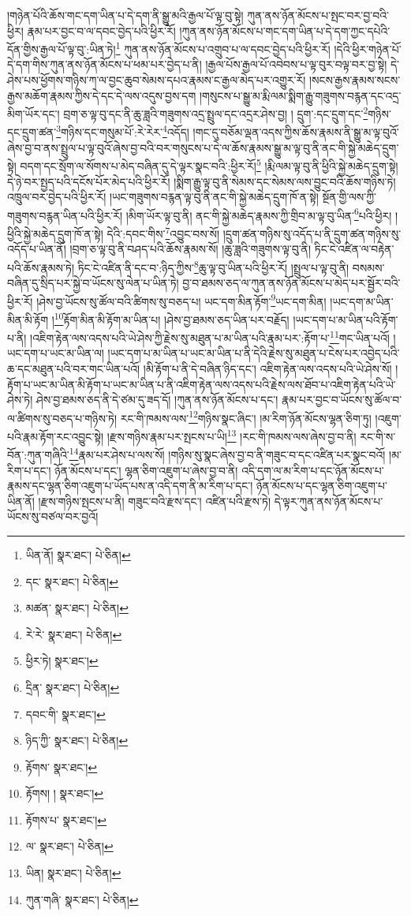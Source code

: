 །གཉེན་པོའི་ཆོས་གང་དག་ཡིན་པ་དེ་དག་ནི་སྒྱུ་མའི་རྒྱལ་པོ་ལྟ་བུ་སྟེ། ཀུན་ནས་ཉོན་མོངས་པ་སྤང་བར་བྱ་བའི་ཕྱིར། རྣམ་པར་བྱང་བ་ལ་དབང་བྱེད་པའི་ཕྱིར་རོ། །ཀུན་ནས་ཉོན་མོངས་པ་གང་དག་ཡིན་པ་དེ་དག་ཀྱང་དཔེའི་དོན་གྱིས་རྒྱལ་པོ་ལྟ་བུ་:ཡིན་ཏེ།\footnote{ཡིན་ནོ།  སྣར་ཐང་།  པེ་ཅིན། } ཀུན་ནས་ཉོན་མོངས་པ་འགྲུབ་པ་ལ་དབང་བྱེད་པའི་ཕྱིར་རོ། །དེའི་ཕྱིར་གཉེན་པོ་དེ་དག་གིས་ཀུན་ནས་ཉོན་མོངས་པ་ཕམ་པར་བྱེད་པ་ནི། །རྒྱལ་པོས་རྒྱལ་པོ་འབེབས་པ་ལྟ་བུར་བལྟ་བར་བྱ་སྟེ། དེ་ཤེས་པས་ཕྱོགས་གཉིས་ཀ་ལ་བྱང་ཆུབ་སེམས་དཔའ་རྣམས་ང་རྒྱལ་མེད་པར་འགྱུར་རོ། །སངས་རྒྱས་རྣམས་སངས་རྒྱས་མཆོག་རྣམས་ཀྱིས་དེ་དང་དེ་ལས་འདུས་བྱས་དག །གསུངས་པ་སྒྱུ་མ་རྨི་ལམ་སྨིག་རྒྱུ་གཟུགས་བརྙན་དང་འདྲ་མིག་ཡོར་དང་། བྲག་ཅ་ལྟ་བུ་དང་ནི་ཆུ་ཟླའི་གཟུགས་འདྲ་སྤྲུལ་དང་འདྲར་ཤེས་བྱ། །
དྲུག་:དང་དྲུག་དང་\footnote{དང་  སྣར་ཐང་།  པེ་ཅིན། }གཉིས་དང་དྲུག་ཚན་\footnote{མཚན་  སྣར་ཐང་།  པེ་ཅིན། }གཉིས་དང་གསུམ་པོ་:རེ་རེར་\footnote{རེ་རེ་  སྣར་ཐང་།  པེ་ཅིན། }འདོད། །གང་དུ་བཅོམ་ལྡན་འདས་ཀྱིས་ཆོས་རྣམས་ནི་སྒྱུ་མ་ལྟ་བུའོ་ཞེས་བྱ་བ་ནས་སྤྲུལ་པ་ལྟ་བུའོ་ཞེས་བྱ་བའི་བར་གསུངས་པ་དེ་ལ་ཆོས་རྣམས་སྒྱུ་མ་ལྟ་བུ་ནི་ནང་གི་སྐྱེ་མཆེད་དྲུག་སྟེ། བདག་དང་སྲོག་ལ་སོགས་པ་མེད་བཞིན་དུ་དེ་ལྟར་སྣང་བའི་:ཕྱིར་རོ།\footnote{ཕྱིར་ཏེ།  སྣར་ཐང་། } །རྨི་ལམ་ལྟ་བུ་ནི་ཕྱིའི་སྐྱེ་མཆེད་དྲུག་སྟེ། དེ་ཉེ་བར་སྤྱད་པའི་དངོས་པོར་མེད་པའི་ཕྱིར་རོ། །སྨིག་རྒྱུ་ལྟ་བུ་ནི་སེམས་དང་སེམས་ལས་བྱུང་བའི་ཆོས་གཉིས་ཏེ། འཁྲུལ་བར་བྱེད་པའི་ཕྱིར་རོ། །ཡང་གཟུགས་བརྙན་ལྟ་བུ་ནི་ནང་གི་སྐྱེ་མཆེད་དྲུག་ཁོ་ན་སྟེ། སྔོན་གྱི་ལས་ཀྱི་གཟུགས་བརྙན་ཡིན་པའི་ཕྱིར་རོ། །མིག་ཡོར་ལྟ་བུ་ནི། ནང་གི་སྐྱེ་མཆེད་རྣམས་ཀྱི་གྲིབ་མ་ལྟ་བུ་ཡིན་\footnote{དྲིན་  སྣར་ཐང་།  པེ་ཅིན། }པའི་ཕྱིར། །ཕྱིའི་སྐྱེ་མཆེད་དྲུག་ཁོ་ན་སྟེ། དེའི་:དབང་གིས་\footnote{དབང་གི་  སྣར་ཐང་། }འབྱུང་བས་སོ། །དྲུག་ཚན་གཉིས་སུ་འདོད་པ་ནི་དྲུག་ཚན་གཉིས་སུ་འདོད་པ་ཡིན་ནོ། །བྲག་ཅ་ལྟ་བུ་ནི་བཤད་པའི་ཆོས་རྣམས་སོ། །ཆུ་ཟླའི་གཟུགས་ལྟ་བུ་ནི། ཏིང་ངེ་འཛིན་ལ་བརྟེན་པའི་ཆོས་རྣམས་ཏེ། ཏིང་ངེ་འཛིན་ནི་དང་བ་:ཉིད་ཀྱིས་\footnote{ཉིད་ཀྱི་  སྣར་ཐང་།  པེ་ཅིན། }ཆུ་ལྟ་བུ་ཡིན་པའི་ཕྱིར་རོ། །སྤྲུལ་པ་ལྟ་བུ་ནི། བསམས་བཞིན་དུ་སྲིད་པར་སྐྱེ་བ་ཡོངས་སུ་ལེན་པ་ཡིན་ཏེ། བྱ་བ་ཐམས་ཅད་ལ་ཀུན་ནས་ཉོན་མོངས་པ་མེད་པར་སྦྱོར་བའི་ཕྱིར་རོ། །ཤེས་བྱ་ཡོངས་སུ་ཚོལ་བའི་ཚིགས་སུ་བཅད་པ། ཡང་དག་མིན་རྟོག་\footnote{རྟོགས་  སྣར་ཐང་། }ཡང་དག་མིན། །ཡང་དག་མ་ཡིན་མིན་མི་རྟོག །\footnote{རྟོགས། །  སྣར་ཐང་། }རྟོག་མིན་མི་རྟོག་མ་ཡིན་པ། །ཤེས་བྱ་ཐམས་ཅད་ཡིན་པར་བརྗོད། །ཡང་དག་པ་མ་ཡིན་པའི་རྟོག་པ་ནི། །འཇིག་རྟེན་ལས་འདས་པའི་ཡེ་ཤེས་ཀྱི་རྗེས་སུ་མཐུན་པ་མ་ཡིན་པའི་རྣམ་པར་:རྟོག་པ་\footnote{རྟོགས་པ་  སྣར་ཐང་། }གང་ཡིན་པའོ། །ཡང་དག་པ་ཡང་མ་ཡིན་ལ། །ཡང་དག་པ་མ་ཡིན་པ་ཡང་མ་ཡིན་པ་ནི་དེའི་རྗེས་སུ་མཐུན་པ་ངེས་པར་འབྱེད་པའི་ཆ་དང་མཐུན་པའི་བར་གང་ཡིན་པའོ། །མི་རྟོག་པ་ནི་དེ་བཞིན་ཉིད་དང་། འཇིག་རྟེན་ལས་འདས་པའི་ཡེ་ཤེས་སོ། །རྟོག་པ་ཡང་མ་ཡིན་མི་རྟོག་པ་ཡང་མ་ཡིན་པ་ནི་འཇིག་རྟེན་ལས་འདས་པའི་རྗེས་ལས་ཐོབ་པ་འཇིག་རྟེན་པའི་ཡེ་ཤེས་ཏེ། ཤེས་བྱ་ཐམས་ཅད་ནི་དེ་ཙམ་དུ་ཟད་དོ། །ཀུན་ནས་ཉོན་མོངས་པ་དང་། རྣམ་པར་བྱང་བ་ཡོངས་སུ་ཚོལ་བ་ལ་ཚིགས་སུ་བཅད་པ་གཉིས་ཏེ། རང་གི་ཁམས་ལས་\footnote{ལ་  སྣར་ཐང་།  པེ་ཅིན། }གཉིས་སྣང་ཞིང་། །མ་རིག་ཉོན་མོངས་ལྷན་ཅིག་ཏུ། །འཇུག་པའི་རྣམ་རྟོག་རང་འབྱུང་སྟེ། །རྫས་གཉིས་རྣམ་པར་སྤངས་པ་ཡི།\footnote{ཡིན།  སྣར་ཐང་།  པེ་ཅིན། } །རང་གི་ཁམས་ལས་ཞེས་བྱ་བ་ནི། རང་གི་ས་བོན་:ཀུན་གཞིའི་\footnote{ཀུན་གཞི་  སྣར་ཐང་།  པེ་ཅིན། }རྣམ་པར་ཤེས་པ་ལས་སོ། །གཉིས་སུ་སྣང་ཞེས་བྱ་བ་ནི་གཟུང་བ་དང་འཛིན་པར་སྣང་བའོ། །མ་རིག་པ་དང་། ཉོན་མོངས་པ་དང་། ལྷན་ཅིག་འཇུག་པ་ཞེས་བྱ་བ་ནི། འདི་དག་ལ་མ་རིག་པ་དང་ཉོན་མོངས་པ་རྣམས་དང་ལྷན་ཅིག་འཇུག་པ་ཡོད་པས་ན་འདི་དག་ནི་མ་རིག་པ་དང་། ཉོན་མོངས་པ་དང་ལྷན་ཅིག་འཇུག་པ་ཡིན་ནོ། །རྫས་གཉིས་སྤངས་པ་ནི། གཟུང་བའི་རྫས་དང་། འཛིན་པའི་རྫས་ཏེ། དེ་ལྟར་ཀུན་ནས་ཉོན་མོངས་པ་ཡོངས་སུ་བཙལ་བར་བྱའོ། 